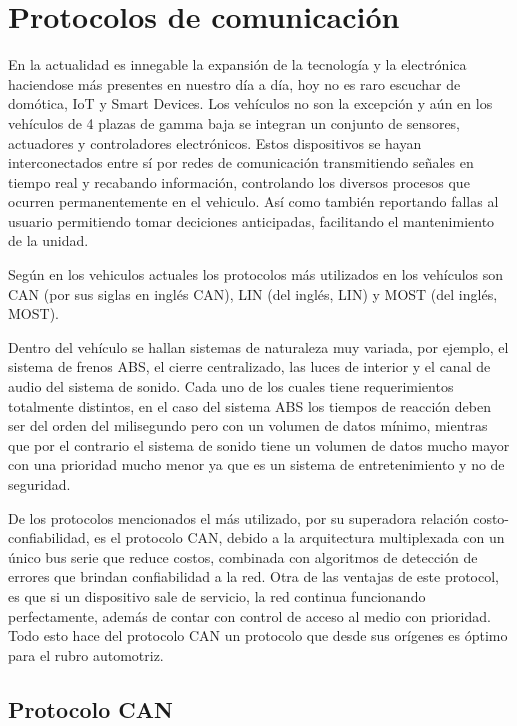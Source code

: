 \newpage

\section{Protocolos de comunicación}

En la actualidad es innegable la expansión de la tecnología y la electrónica 
haciendose más presentes en nuestro día a día, hoy no es raro escuchar de 
domótica, IoT y Smart Devices. Los vehículos no son la excepción y aún en los 
vehículos de 4 plazas de gamma baja se integran un conjunto de sensores, 
actuadores y controladores electrónicos. Estos dispositivos se hayan 
interconectados entre sí por redes de comunicación transmitiendo señales en 
tiempo real y recabando información, controlando los diversos procesos que 
ocurren permanentemente en el vehiculo. Así como también reportando fallas al 
usuario permitiendo tomar deciciones anticipadas, facilitando el mantenimiento 
de la unidad.

Seg\'un \cite{Vela2016} en los vehiculos actuales los protocolos más utilizados en los vehículos son 
\acrshort{CAN} (por sus siglas en inglés \acrfull{CAN}), \acrshort{LIN} (del
inglés, \acrfull{LIN}) y \acrshort{MOST} (del inglés, \acrfull{MOST}).

Dentro del vehículo se hallan sistemas de naturaleza muy variada, por ejemplo, 
el sistema de frenos ABS, el cierre centralizado, las luces de interior y el 
canal de audio del sistema de sonido. Cada uno de los cuales tiene 
requerimientos totalmente distintos, en el caso del sistema ABS los tiempos de 
reacción deben ser del orden del milisegundo pero con un volumen de datos mínimo, 
mientras que por el contrario el sistema de sonido tiene un volumen de datos 
mucho mayor con una prioridad mucho menor ya que es un sistema de 
entretenimiento y no de seguridad.

De los protocolos mencionados el más utilizado, por su superadora relación
costo-confiabilidad, es el protocolo \acrshort{CAN}, debido a la arquitectura 
multiplexada con un único bus serie que reduce costos, combinada con algoritmos 
de detección de errores que brindan confiabilidad a la red. Otra de las ventajas 
de este protocol, es que si un dispositivo sale de servicio, la red continua 
funcionando perfectamente, además de contar con control de acceso al medio con 
prioridad. Todo esto hace del protocolo \acrshort{CAN} un protocolo que desde 
sus orígenes es óptimo para el rubro automotriz.

\subsection{Protocolo CAN}

